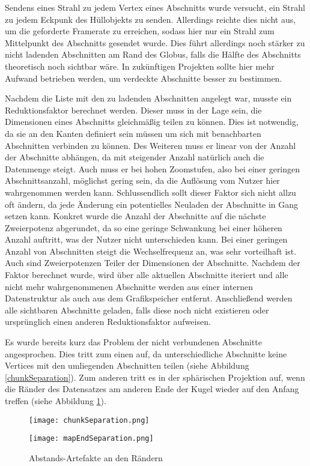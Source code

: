 Sendens eines Strahl zu jedem Vertex eines Abschnitts wurde versucht, ein Strahl zu jedem Eckpunk des Hüllobjekts zu senden. Allerdings reichte dies nicht aus, um die geforderte Framerate zu erreichen, sodass hier nur ein Strahl zum Mittelpunkt des Abschnitts gesendet wurde. Dies führt allerdings noch stärker zu nicht ladenden Abschnitten am Rand des Globus, falls die Hälfte des Abschnitts theoretisch noch sichtbar wäre. In zukünftigen Projekten sollte hier mehr Aufwand betrieben werden, um verdeckte Abschnitte besser zu bestimmen.

Nachdem die Liste mit den zu ladenden Abschnitten angelegt war, musste ein Reduktionsfaktor berechnet werden. Dieser muss in der Lage sein, die Dimensionen eines Abschnitts gleichmäßig teilen zu können. Dies ist notwendig, da sie an den Kanten definiert sein müssen um sich mit benachbarten Abschnitten verbinden zu können. Des Weiteren muss er linear von der Anzahl der Abschnitte abhängen, da mit steigender Anzahl natürlich auch die Datenmenge steigt. Auch muss er bei hohen Zoomstufen, also bei einer geringen Abschnittsanzahl, möglichst gering sein, da die Auflösung vom Nutzer hier wahrgenommen werden kann. Schlussendlich sollt dieser Faktor sich nicht allzu oft ändern, da jede Änderung ein potentielles Neuladen der Abschnitte in Gang setzen kann. Konkret wurde die Anzahl der Abschnitte auf die nächste Zweierpotenz abgerundet, da so eine geringe Schwankung bei einer höheren Anzahl auftritt, was der Nutzer nicht unterschieden kann. Bei einer geringen Anzahl von Abschnitten steigt die Wechselfrequenz an, was sehr vorteilhaft ist. Auch sind Zweierpotenzen Teiler der Dimensionen der Abschnitte. Nachdem der Faktor berechnet wurde, wird über alle aktuellen Abschnitte iteriert und alle nicht mehr wahrgenommenen Abschnitte werden aus einer internen Datenstruktur als auch aus dem Grafikspeicher entfernt. Anschließend werden alle sichtbaren Abschnitte geladen, falls diese noch nicht existieren oder ursprünglich einen anderen Reduktionsfaktor aufweisen.

Es wurde bereits kurz das Problem der nicht verbundenen Abschnitte angesprochen. Dies tritt zum einen auf, da unterschiedliche Abschnitte keine Vertices mit den umliegenden Abschnitten teilen (siehe Abbildung \ref{chunkSeparation}). Zum anderen tritt es in der sphärischen Projektion auf, wenn die Ränder des Datensatzes am anderen Ende der Kugel wieder auf den Anfang treffen (siehe Abbildung \ref{mapEndSeparation}).

\begin{figure}[H] 
  \centering
  \begin{minipage}[b]{0.45\textwidth}
    \texttt{[image: chunkSeparation.png]}
    \label{chunkSeparation}
  \end{minipage}
  \hfill
  \begin{minipage}[b]{0.45\textwidth}
    \texttt{[image: mapEndSeparation.png]}
    \label{mapEndSeparation}
  \end{minipage}
  \caption{Abstands-Artefakte an den R\"andern}
\end{figure}

